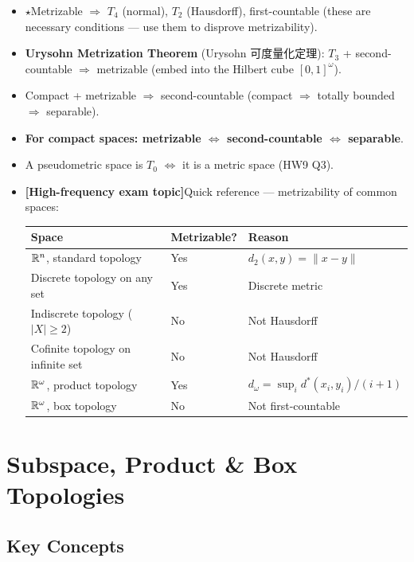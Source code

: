 \documentclass{article}
\newcommand{\starKey}{\textcolor{red!65!black}{\textbf{$\star$}}}
\newcommand{\examKey}{\textcolor{red!65!black}{\textbf{[High-frequency exam topic]}}}
\begin{document}
\begin{itemize}
  \item \starKey Metrizable $\Rightarrow$ $T_4$ (normal), $T_2$ (Hausdorff),
  first-countable (these are necessary conditions --- use them to disprove metrizability).
  \item \textbf{Urysohn Metrization Theorem} (Urysohn 可度量化定理):
  $T_3$ + second-countable $\Rightarrow$ metrizable (embed into the Hilbert cube $[0,1]^\omega$).
  \item Compact + metrizable $\Rightarrow$ second-countable
  (compact $\Rightarrow$ totally bounded $\Rightarrow$ separable).
  \item \textbf{For compact spaces: metrizable $\iff$ second-countable $\iff$ separable}.
  \item A pseudometric space is $T_0$ $\iff$ it is a metric space (HW9 Q3).
  \item \examKey Quick reference --- metrizability of common spaces:
  \begin{center}
    \begin{tabular}{@{}lll@{}}
      \hline
      \textbf{Space} & \textbf{Metrizable?} & \textbf{Reason} \\
      \hline
      $\mathbb{R}^n$, standard topology & Yes & $d_2(x,y)=\|x-y\|$ \\
      Discrete topology on any set & Yes & Discrete metric \\
      Indiscrete topology ($|X|\ge2$) & No & Not Hausdorff \\
      Cofinite topology on infinite set & No & Not Hausdorff \\
      $\mathbb{R}^\omega$, product topology & Yes & $d_\omega=\sup_i d^*(x_i,y_i)/(i+1)$ \\
      $\mathbb{R}^\omega$, box topology & No & Not first-countable \\
      \hline
    \end{tabular}
  \end{center}
\end{itemize}

\section{Subspace, Product \& Box Topologies}

\subsection{Key Concepts}
\end{document}
